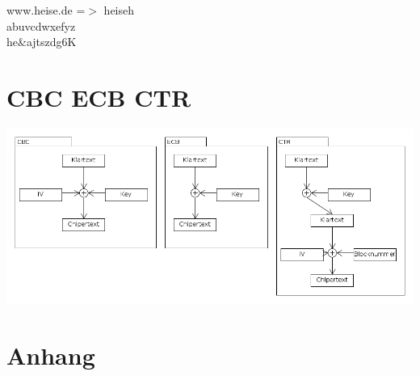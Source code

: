 \documentclass[12pt,a4paper,oneside,ngerman]{article}
\begin{document}
www.heise.de =$>$ heiseh\\
abuvcdwxefyz\\
he\&ajtszdg6K\\

\section{CBC ECB CTR}
\includegraphics[scale=0.5]{cbc_ecb_ctr.png}

\section{Anhang}

\end{document}
